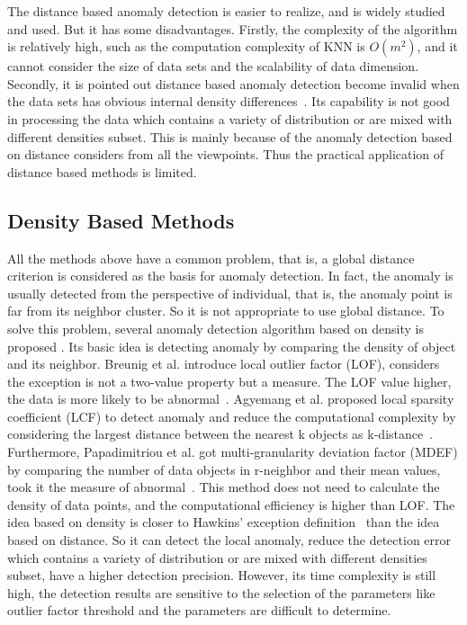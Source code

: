 The distance based anomaly detection
is easier to realize,
and is widely studied and used.
But it has some disadvantages.
Firstly,
the complexity of the algorithm is relatively high,
such as the computation complexity of KNN is $O(m^2)$,
and it cannot consider the size of 
data sets and the scalability of data dimension.
Secondly,
it is pointed out distance based anomaly detection become invalid when 
the data sets has obvious internal density
differences~\cite{breunig2000lof}.
Its capability is not good in processing the data which
contains a variety of distribution or
are mixed with different densities subset.
This is mainly because of the anomaly detection based on
distance considers from all the viewpoints.
Thus the practical application  of distance based methods is limited.

\subsection{Density Based Methods}
All the methods above have a common problem,
that is,
a global distance criterion is considered as
the basis for anomaly detection.
In fact,
the anomaly is usually detected
from the perspective of individual,
that is,
the anomaly point is far from its neighbor cluster.
So it is not appropriate
to use global distance.
To solve this problem,
several anomaly detection
algorithm based
on density is proposed .
Its basic idea is detecting anomaly by comparing
the density of object and its neighbor.
Breunig et al. introduce local
outlier factor (LOF),
considers the exception is not a
two-value property but a measure.
The LOF value higher,
the data is more likely to be abnormal~\cite{breunig2000lof}.
Agyemang et al.
proposed local sparsity coefficient (LCF) to
detect anomaly and reduce
the computational complexity by considering
the largest distance between the nearest k objects as
k-distance~\cite{agyemang2004algorithm}.
Furthermore,
Papadimitriou et al. got multi-granularity
deviation factor (MDEF) by
comparing the number of data objects in r-neighbor and
their mean values,
took it the measure of abnormal~\cite{papadimitriou2003loci}.
This method does not need to calculate the density of data
points,
and the computational efficiency is higher than LOF.
The idea based on density is closer to Hawkins’ exception
definition~\cite{hawkins1980identification}
than the idea based on distance.
So it can detect the local anomaly,
reduce the detection error which contains
a variety of distribution or are mixed with different
densities subset,
have a higher detection precision.
However,
its time complexity is still high,
the detection
results are sensitive to the selection of the parameters like
outlier factor threshold and the parameters are difficult to
determine.

